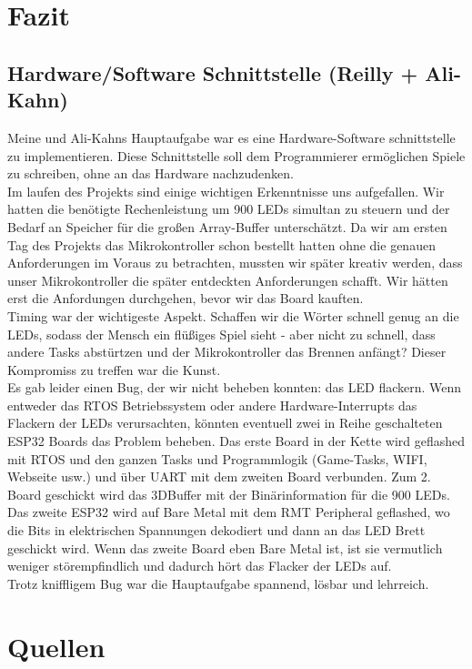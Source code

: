 \documentclass[12pt,a4paper]{article}
\begin{document}
\section{Fazit}
\subsection{Hardware/Software Schnittstelle (Reilly + Ali-Kahn)} 
Meine und Ali-Kahns Hauptaufgabe war es eine Hardware-Software schnittstelle zu implementieren. Diese Schnittstelle soll dem Programmierer ermöglichen Spiele zu schreiben, ohne an das Hardware nachzudenken.
\vspace{1ex}\\
Im laufen des Projekts sind einige wichtigen Erkenntnisse uns aufgefallen. Wir hatten die benötigte Rechenleistung um 900 LEDs simultan zu steuern und der Bedarf an Speicher für die großen Array-Buffer unterschätzt. Da wir am ersten Tag des Projekts das Mikrokontroller schon bestellt hatten ohne die genauen Anforderungen im Voraus zu betrachten, mussten wir später kreativ werden, dass unser Mikrokontroller die später entdeckten Anforderungen schafft. Wir hätten erst die Anfordungen durchgehen, bevor wir das Board kauften.
\vspace{1ex}\\
Timing war der wichtigeste Aspekt. Schaffen wir die Wörter schnell genug an die LEDs, sodass der Mensch ein flüßiges Spiel sieht - aber nicht zu schnell, dass andere Tasks abstürtzen und der Mikrokontroller das Brennen anfängt? Dieser Kompromiss zu treffen war die Kunst.
\vspace{1ex}\\
Es gab leider einen Bug, der wir nicht beheben konnten: das LED flackern. Wenn entweder das RTOS Betriebssystem oder andere Hardware-Interrupts das Flackern der LEDs verursachten, könnten eventuell zwei in Reihe geschalteten ESP32 Boards das Problem beheben. Das erste Board in der Kette wird geflashed mit RTOS und den ganzen Tasks und Programmlogik (Game-Tasks, WIFI, Webseite usw.) und über UART mit dem zweiten Board verbunden. Zum 2. Board geschickt wird das 3DBuffer mit der Binärinformation für die 900 LEDs. Das zweite ESP32 wird auf Bare Metal mit dem RMT Peripheral geflashed, wo die Bits in elektrischen Spannungen dekodiert und dann an das LED Brett geschickt wird. Wenn das zweite Board eben Bare Metal ist, ist sie vermutlich weniger störempfindlich und dadurch hört das Flacker der LEDs auf.
\vspace{1ex}\\
Trotz kniffligem Bug war die Hauptaufgabe spannend, lösbar und lehrreich.
\vspace{1ex}\\
\newpage

\section{Quellen}
\printbibliography[heading=none]
\listoffigures
\end{document}
